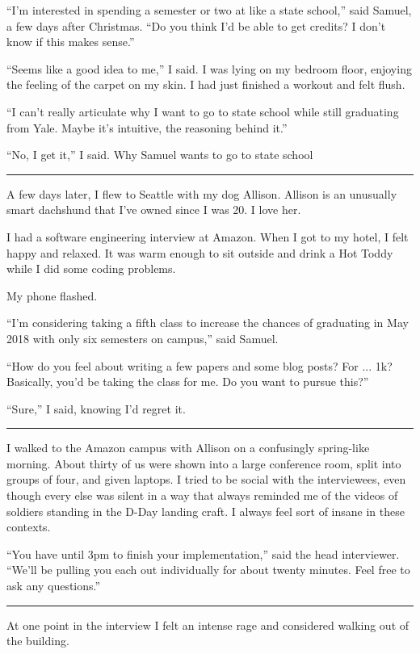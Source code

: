 ``I'm interested in spending a semester or two at like a state school,'' said
Samuel, a few days after Christmas.  ``Do you think I'd be able to get credits?
I don't know if this makes sense.''

``Seems like a good idea to me,'' I said.  I was lying on my bedroom floor,
enjoying the feeling of the carpet on my skin.  I had just finished a workout
and felt flush.

``I can't really articulate why I want to go to state school while still
graduating from Yale.   Maybe it's intuitive, the reasoning behind it.'' 

``No, I get it,'' I said.  Why Samuel wants to go to state school

\plainfancybreak{12pt}{2}{* * *}

A few days later, I flew to Seattle with my dog Allison.  Allison is an
unusually smart dachshund that I've owned since I was 20.  I love her.  

I had a software engineering interview at Amazon.  When I got to my hotel, I
felt happy and relaxed. It was warm enough to sit outside and drink a Hot Toddy
while I did some coding problems. 

My phone flashed.

``I'm considering taking a fifth class to increase the chances of graduating in
May 2018 with only six semesters on campus,'' said Samuel.  

``How do you feel about writing a few papers and some blog posts?  For ... 1k?
Basically, you'd be taking the class for me.  Do you want to pursue this?'' 

``Sure,'' I said, knowing I'd regret it.

\plainfancybreak{12pt}{2}{* * *}

I walked to the Amazon campus with Allison on a confusingly spring-like morning. 
About thirty of us were shown into a large conference room, split into groups of
four, and given laptops.  I tried to be social with the interviewees, even
though every else was silent in a way that always reminded me of the videos of
soldiers standing in the D-Day landing craft.  I always feel sort of insane in these
contexts.

``You have until 3pm to finish your implementation,'' said the head interviewer.
``We'll be pulling you each out individually for about twenty minutes.  Feel
free to ask any questions.''

\plainfancybreak{12pt}{2}{* * *}

At one point in the interview I felt an intense rage and considered walking out
of the building.

